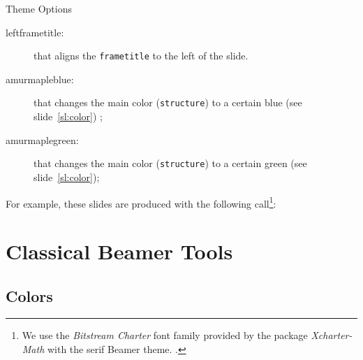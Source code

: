 \documentclass[10pt,aspectratio=169,english]{beamer}
\begin{document}
\begin{frame}{Theme Options}
\begin{description}
    \item[leftframetitle:] that aligns the \lstinline+frametitle+ to the left of
      the slide.
      \framebreak
    \item[amurmapleblue:] that changes the main color (\lstinline+structure+) to a
    certain blue (see slide~\ref{sl:color}) ;
  \item[amurmaplegreen:] that changes the main color (\lstinline+structure+) to a
    certain green (see slide~\ref{sl:color});
  \end{description}
  For example, these slides are produced with the following call\footnote{We use
  the \emph{Bitstream Charter} font family provided by the package
  \emph{Xcharter-Math}  with the serif Beamer theme. .}:
  \begin{CodePreambule}
  \end{CodePreambule}
\end{frame}



\section{Classical Beamer Tools}
\sepframe
\subsection{Colors}
\end{document}
